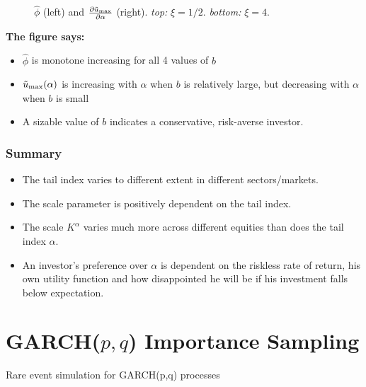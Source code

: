 \documentclass{beamer}
\begin{document}
\begin{frame}
\begin{minipage}[t]{0.5\linewidth}
\begin{figure}[htb!]
\begin{minipage}{0.5\linewidth}
      \end{minipage}
      \caption{$\hat\phi$ (left) and
        ${\partial \tilde u_{\rm max} \over \partial \alpha}$ (right).
        {\em top:} $\xi = 1/2$. {\em bottom:} $\xi = 4$.
      }
      \label{fig:htfg}
    \end{figure}
  \end{minipage}\hfill
  \begin{minipage}[t]{0.5\linewidth}
    \textcolor[HTML]{990033}{\bf The figure says:}
    \begin{itemize}
    \item  $\hat\phi$ is monotone increasing for all 4 values of $b$
    \item $\tilde u_{\rm max}(\alpha)$ is increasing with $\alpha$
      when $b$ is relatively large, but  decreasing with $\alpha$ when
      $b$ is small
    \item A sizable value of $b$ indicates a conservative, risk-averse investor.
    \end{itemize}
  \end{minipage}
\end{frame}

\begin{frame}
  \frametitle{Summary}
  \begin{itemize}
  \item The tail index varies to different extent in different
    sectors/markets.
  \item The scale parameter is positively dependent on the tail index.
  \item The scale $K^{\alpha}$ varies much more across different
    equities than does the tail index $\alpha$.
  \item An investor's preference over $\alpha$ is dependent on the
    riskless rate of return, his own utility function and how
    disappointed he will be if his investment falls below
    expectation.
  \end{itemize}
\end{frame}

\section{GARCH($p, q$) Importance Sampling}
\begin{frame}
  Rare event simulation for GARCH(p,q) processes
\end{frame}
\end{document}
